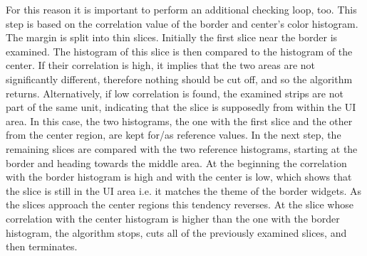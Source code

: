 \documentclass[draft,final]{vutinfth} %
\begin{document}
	For this reason it is important to perform an additional checking loop, too.
	This step is based on the correlation value of the border and center's color histogram.
	The margin is split into thin slices.
	Initially the first slice near the border is examined.
	The histogram of this slice is then compared to the histogram of the center.
	If their correlation is high, it implies that the two areas are not significantly different, therefore nothing should be cut off, and so the algorithm returns.
	Alternatively, if low correlation is found, the examined strips are not part of the same unit, indicating that the slice is supposedly from within the UI area.
	In this case, the two histograms, the one with the first slice and the other from the center region, are kept for/as reference values.
	In the next step, the remaining slices are compared with the two reference histograms, starting at the border and heading towards the middle area.
	At the beginning the correlation with the border histogram is high and with the center is low, which shows that the slice is still in the UI area i.e. it matches the theme of the border widgets.
	As the slices approach the center regions this tendency reverses.
	At the slice whose correlation with the center histogram is higher than the one with the border histogram, the algorithm stops, cuts all of the previously examined slices, and then terminates.\par 
	
\end{document}
